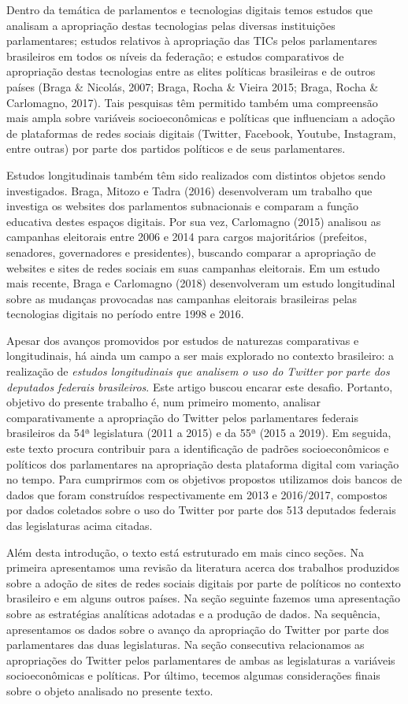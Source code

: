Dentro da temática de parlamentos e tecnologias digitais temos estudos
que analisam a apropriação destas tecnologias pelas diversas
instituições parlamentares; estudos relativos à apropriação das TICs
pelos parlamentares brasileiros em todos os níveis da federação; e
estudos comparativos de apropriação destas tecnologias entre as elites
políticas brasileiras e de outros países (Braga \& Nicolás, 2007; Braga,
Rocha \& Vieira 2015; Braga, Rocha \& Carlomagno, 2017). Tais pesquisas
têm permitido também uma compreensão mais ampla sobre variáveis
socioeconômicas e políticas que influenciam a adoção de plataformas de
redes sociais digitais (Twitter, Facebook, Youtube, Instagram, entre
outras) por parte dos partidos políticos e de seus parlamentares.

Estudos longitudinais também têm sido realizados com distintos objetos
sendo investigados. Braga, Mitozo e Tadra (2016) desenvolveram um
trabalho que investiga os websites dos parlamentos subnacionais e
comparam a função educativa destes espaços digitais. Por sua vez,
Carlomagno (2015) analisou as campanhas eleitorais entre 2006 e 2014
para cargos majoritários (prefeitos, senadores, governadores e
presidentes), buscando comparar a apropriação de websites e sites de
redes sociais em suas campanhas eleitorais. Em um estudo mais recente,
Braga e Carlomagno (2018) desenvolveram um estudo longitudinal sobre as
mudanças provocadas nas campanhas eleitorais brasileiras pelas
tecnologias digitais no período entre 1998 e 2016.

Apesar dos avanços promovidos por estudos de naturezas comparativas e
longitudinais, há ainda um campo a ser mais explorado no contexto
brasileiro: a realização de \emph{estudos longitudinais} \emph{que
analisem o uso do Twitter por parte dos deputados federais brasileiros}.
Este artigo buscou encarar este desafio. Portanto, objetivo do presente
trabalho é, num primeiro momento, analisar comparativamente a
apropriação do Twitter pelos parlamentares federais brasileiros da 54ª
legislatura (2011 a 2015) e da 55ª (2015 a 2019). Em seguida, este texto
procura contribuir para a identificação de padrões socioeconômicos e
políticos dos parlamentares na apropriação desta plataforma digital com
variação no tempo. Para cumprirmos com os objetivos propostos utilizamos
dois bancos de dados que foram construídos respectivamente em 2013 e
2016/2017, compostos por dados coletados sobre o uso do Twitter por
parte dos 513 deputados federais das legislaturas acima citadas.

Além desta introdução, o texto está estruturado em mais cinco seções. Na
primeira apresentamos uma revisão da literatura acerca dos trabalhos
produzidos sobre a adoção de sites de redes sociais digitais por parte
de políticos no contexto brasileiro e em alguns outros países. Na seção
seguinte fazemos uma apresentação sobre as estratégias analíticas
adotadas e a produção de dados. Na sequência, apresentamos os dados
sobre o avanço da apropriação do Twitter por parte dos parlamentares das
duas legislaturas. Na seção consecutiva relacionamos as apropriações do
Twitter pelos parlamentares de ambas as legislaturas a variáveis
socioeconômicas e políticas. Por último, tecemos algumas considerações
finais sobre o objeto analisado no presente texto.

